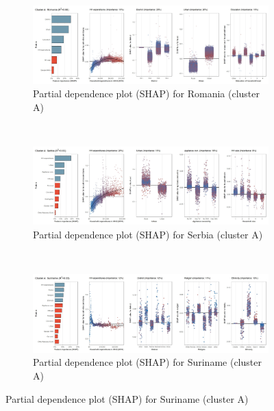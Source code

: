 \begin{figure}[ht!]\ContinuedFloat
    \centering
   \begin{subfigure}[b]{\textwidth}
    \centering
         \caption{Partial dependence plot (SHAP) for Romania (cluster A)}
         \label{fig:5b_ROU}
         \includegraphics[width=\textwidth]{Figure 5b/Figure_5b_ROU}
         \end{subfigure}
    \\
    \vspace{0.5cm}
   \begin{subfigure}[b]{\textwidth}
   \centering
         \caption{Partial dependence plot (SHAP) for Serbia (cluster A)}
         \label{fig:5b_SRB}
         \includegraphics[width=\textwidth]{Figure 5b/Figure_5b_SRB} 
         \end{subfigure}
    \\
    \vspace{0.5cm}
   \begin{subfigure}[b]{\textwidth}
   \centering
         \caption{Partial dependence plot (SHAP) for Suriname (cluster A)}
         \label{fig:5b_SUR}
         \includegraphics[width=\textwidth]{Figure 5b/Figure_5b_SUR}         

\end{subfigure}
\end{figure}

